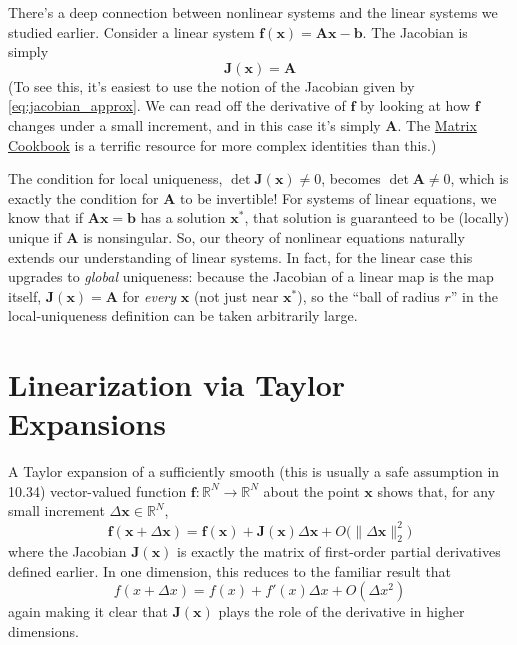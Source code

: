 There's a deep connection between nonlinear systems and the linear systems we studied earlier. Consider a linear system $\mathbf{f}(\mathbf{x}) = \mathbf{A}\mathbf{x} - \mathbf{b}$. The Jacobian is simply
\begin{equation}
\mathbf{J}(\mathbf{x}) = \mathbf{A}
\end{equation}
(To see this, it's easiest to use the notion of the Jacobian given by \autoref{eq:jacobian_approx}. We can read off the derivative of $\mathbf f$ by looking at how $\mathbf f$ changes under a small increment, and in this case it's simply $\mathbf A$. The \href{https://www.math.uwaterloo.ca/~hwolkowi/matrixcookbook.pdf}{Matrix Cookbook} is a terrific resource for more complex identities than this.)

The condition for local uniqueness, $\det \mathbf{J}(\mathbf{x}) \neq 0$, becomes $\det \mathbf{A} \neq 0$, which is exactly the condition for $\mathbf{A}$ to be invertible! For systems of linear equations, we know that if $\mathbf{Ax=b}$ has a solution $\mathbf x^*$, that solution is guaranteed to be (locally) unique if $\mathbf{A}$ is nonsingular. So, our theory of nonlinear equations naturally extends our understanding of linear systems. In fact, for the linear case this upgrades to \emph{global} uniqueness: because the Jacobian of a linear map is the map itself, $\mathbf J(\mathbf x)=\mathbf A$ for \emph{every} $\mathbf x$ (not just near $\mathbf x^*$), so the ``ball of radius $r$'' in the local-uniqueness definition can be taken arbitrarily large.

\section{Linearization via Taylor Expansions}
\label{sec:sne_linearization_taylor}
A Taylor expansion of a sufficiently smooth (this is usually a safe assumption in 10.34) vector-valued function 
\(\mathbf f\colon\mathbb R^N\to\mathbb R^N\) about the point \(\mathbf x\) shows that, for any small increment \(\Delta\mathbf x\in\mathbb R^N\),
\begin{equation}
\mathbf f(\mathbf x + \Delta\mathbf x) = \mathbf f(\mathbf x) +\mathbf{J}(\mathbf x) \Delta\mathbf x +O\bigl(\|\Delta\mathbf x\|_2^2\bigr)
\end{equation}
where the Jacobian \(\mathbf{J}(\mathbf x)\) is exactly the matrix of first-order partial derivatives defined earlier.  In one dimension, this reduces to the familiar result that
\begin{equation}
f(x+\Delta x)=f(x)+f'(x)\Delta x+ O(\Delta x^2)
\end{equation}
again making it clear that \(\mathbf{J}(\mathbf x)\) plays the role of the derivative in higher dimensions.

